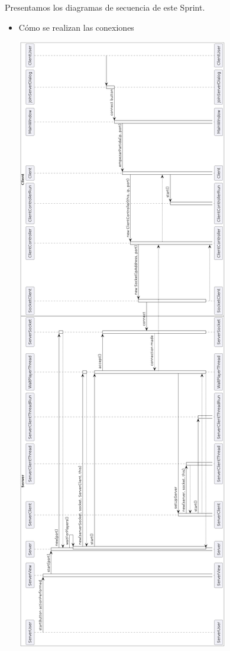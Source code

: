 \documentclass[../DocumentoOficial.tex]{subfiles}
\begin{document}
\begin{sprint}[5]
Presentamos los diagramas de secuencia de este Sprint.

\begin{itemize}

\item Cómo se realizan las conexiones

\begin{center}
\includegraphics[scale=0.41]{conexionesUmlSprint5.png} 
\end{center}


\end{itemize}
\end{sprint}
\end{document}
